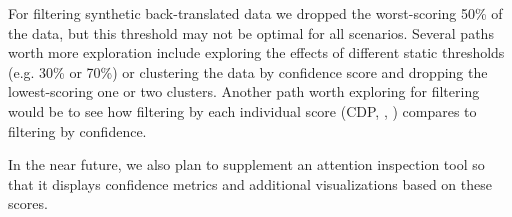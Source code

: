\documentclass[]{article}
\begin{document}
For filtering synthetic back-translated data we dropped the worst-scoring 50\% of the data, but this threshold may not be optimal for all scenarios. Several paths worth more exploration include exploring the effects of different static thresholds (e.g. 30\% or 70\%) or clustering the data by confidence score and dropping the lowest-scoring one or two clusters. Another path worth exploring for filtering would be to see how filtering by each individual score (CDP, , ) compares to filtering by confidence. 

In the near future, we also plan to supplement an attention inspection tool so that it displays confidence metrics and additional visualizations based on these scores.

\FloatBarrier



\end{document}
